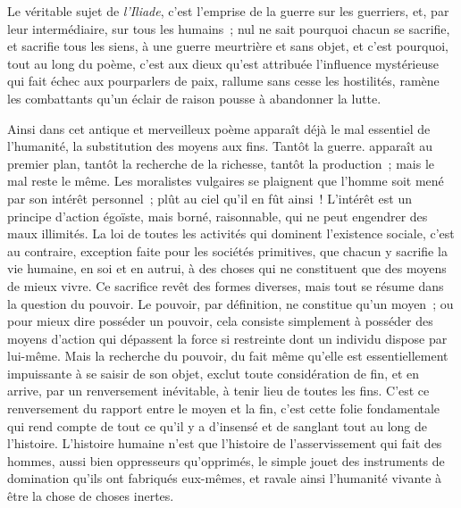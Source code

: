 {Le véritable sujet de \textit{l'Iliade}, c'est l'emprise de la guerre sur les
guerriers, et, par leur intermédiaire, sur tous les humains~; nul ne
sait pourquoi chacun se sacrifie, et sacrifie tous les siens, à une
guerre meurtrière et sans objet, et c'est pourquoi, tout au long du
poème, c'est aux dieux qu'est attribuée l'influence mystérieuse qui
fait échec aux pourparlers de paix, rallume sans cesse les
hostilités, ramène les combattants qu'un éclair de raison pousse à
abandonner la lutte.

Ainsi dans cet antique et merveilleux poème apparaît déjà le mal
essentiel de l'humanité, la substitution des moyens aux fins. Tantôt
la guerre. apparaît au premier plan, tantôt la recherche de la
richesse, tantôt la production~; mais le mal reste le même. Les
moralistes vulgaires se plaignent que l'homme soit mené par son
intérêt personnel~; plût au ciel qu'il en fût ainsi~! L'intérêt est
un principe d'action égoïste, mais borné, raisonnable, qui ne peut
engendrer des maux illimités. La loi de toutes les activités qui
dominent l'existence sociale, c'est au contraire, exception faite
pour les sociétés primitives, que chacun y sacrifie la vie humaine,
en soi et en autrui, à des choses qui ne constituent que des moyens
de mieux vivre. Ce sacrifice revêt des formes diverses, mais tout se
résume dans la question du pouvoir. Le pouvoir, par définition, ne
constitue qu'un moyen~; ou pour mieux dire posséder un pouvoir, cela
consiste simplement à posséder des moyens d'action qui dépassent la
force si restreinte dont un individu dispose par lui-même. Mais la
recherche du pouvoir, du fait même qu'elle est essentiellement
impuissante à se saisir de son objet, exclut toute considération de
fin, et en arrive, par un renversement inévitable, à tenir lieu de
toutes les fins. C'est ce renversement du rapport entre le moyen et
la fin, c'est cette folie fondamentale qui rend compte de tout ce
qu'il y a d'insensé et de sanglant tout au long de l'histoire.
L'histoire humaine n'est que l'histoire de l'asservissement qui fait
des hommes, aussi bien oppresseurs qu'opprimés, le simple jouet des
instruments de domination qu'ils ont fabriqués eux-mêmes, et ravale
ainsi l'humanité vivante à être la chose de choses inertes.
}

